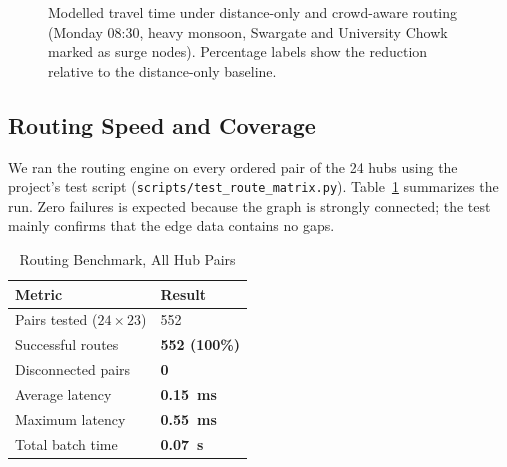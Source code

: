 \documentclass[conference]{IEEEtran}
\begin{document}
\begin{figure}[h]
\centering
{}
\caption{Modelled travel time under distance-only and crowd-aware routing (Monday 08:30, heavy monsoon, Swargate and University Chowk marked as surge nodes). Percentage labels show the reduction relative to the distance-only baseline.}
\label{fig:results}
\end{figure}

\subsection{Routing Speed and Coverage}
We ran the routing engine on every ordered pair of the 24 hubs using the project's test script (\texttt{scripts/test\_route\_matrix.py}). Table~\ref{tab:speed} summarizes the run. Zero failures is expected because the graph is strongly connected; the test mainly confirms that the edge data contains no gaps.

\begin{table}[h]
\caption{Routing Benchmark, All Hub Pairs}
\label{tab:speed}
\centering
\begin{tabular}{ll}
\toprule
\textbf{Metric} & \textbf{Result} \\
\midrule
Pairs tested ($24 \times 23$) & 552 \\
Successful routes              & \textbf{552 (100\%)} \\
Disconnected pairs             & \textbf{0} \\
Average latency                & \textbf{0.15~ms} \\
Maximum latency                & \textbf{0.55~ms} \\
Total batch time               & \textbf{0.07~s} \\
\bottomrule
\end{tabular}
\end{table}
\end{document}
